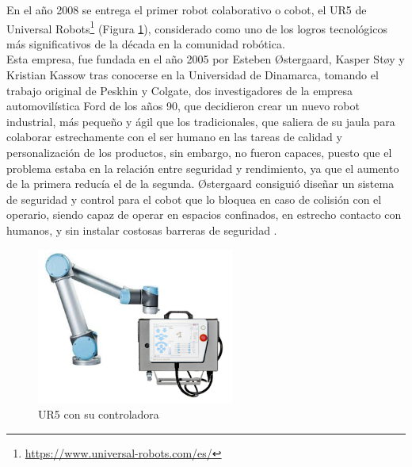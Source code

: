 En el año 2008 se entrega el primer robot colaborativo o cobot, el UR5 de Universal Robots\footnote{\url{https://www.universal-robots.com/es/}} (Figura \ref{fig:UR5}), considerado como uno de los logros tecnológicos más significativos de la década en la comunidad robótica. \\%
Esta empresa, fue fundada en el año 2005 por Esteben Østergaard, Kasper Støy y Kristian Kassow tras conocerse en la Universidad de Dinamarca, %
tomando el trabajo original de Peskhin y Colgate, dos investigadores de la empresa automovilística Ford de los años 90, que decidieron crear un nuevo robot industrial, más pequeño y ágil que los tradicionales, que saliera de su jaula para colaborar estrechamente con el ser humano en las tareas de calidad y personalización de los productos, sin embargo, no fueron capaces, puesto que el problema estaba en la relación entre seguridad y rendimiento, ya que el aumento de la primera reducía el de la segunda. Østergaard consiguió diseñar un sistema de seguridad y control para el cobot que lo bloquea en caso de colisión con el operario, %
siendo capaz de operar en espacios confinados, en estrecho contacto con humanos, y sin instalar costosas barreras de seguridad \cite{Cusano22}.
  
  \begin{figure} [H]
    \begin{center}
      \includegraphics[width=65mm]{figs/UR5_controller.png}
    \end{center}
    \caption{UR5 con su controladora}
    \label{fig:UR5}
  \end{figure}
  
